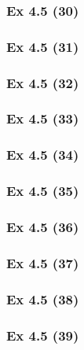 \subsubsection{Ex 4.5 (30)}\label{sec:Ex_4.5.30}

\newpage		%

\subsubsection{Ex 4.5 (31)}\label{sec:Ex_4.5.31}

\subsubsection{Ex 4.5 (32)}\label{sec:Ex_4.5.32}

\subsubsection{Ex 4.5 (33)}\label{sec:Ex_4.5.33}

\subsubsection{Ex 4.5 (34)}\label{sec:Ex_4.5.34}

\subsubsection{Ex 4.5 (35)}\label{sec:Ex_4.5.35}

\subsubsection{Ex 4.5 (36)}\label{sec:Ex_4.5.36}

\subsubsection{Ex 4.5 (37)}\label{sec:Ex_4.5.37}

\subsubsection{Ex 4.5 (38)}\label{sec:Ex_4.5.38}

\subsubsection{Ex 4.5 (39)}\label{sec:Ex_4.5.39}

